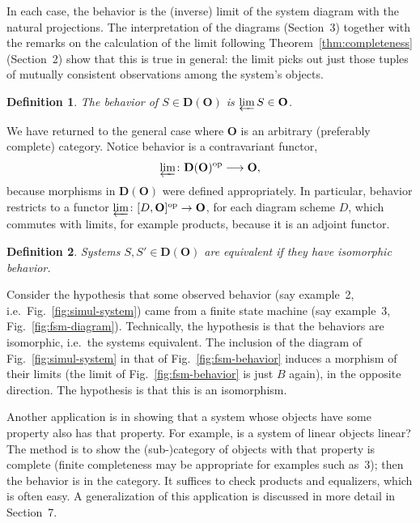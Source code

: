 \documentclass[10pt,a4paper,twocolumn]{article}
\newtheorem*{definition*}{Definition}
\newcommand{\Ocat}{\mathbf{O}}          %
\newcommand{\Dcat}{\mathbf{D}}          %
\begin{document}
In each case, the behavior is the (inverse) limit of the system diagram with the natural projections.
The interpretation of the diagrams (Section~3) together with the remarks on the calculation of the limit following Theorem~\ref{thm:completeness} (Section~2) show that this is true in general: the limit picks out just those tuples of mutually consistent observations among the system's objects.

\begin{definition*}
  The \emph{behavior} of $S\in\Dcat(\Ocat)$ is $\varprojlim S\in\Ocat$.
\end{definition*}

We have returned to the general case where $\Ocat$ is an arbitrary (preferably complete) category.
Notice behavior is a contravariant
functor,
\begin{equation*}
  \varprojlim\colon \Dcat(\Ocat)^{\mathrm{op}}\longrightarrow \Ocat,
\end{equation*}
because morphisms in $\Dcat(\Ocat)$ were defined appropriately.
In particular, behavior restricts to a functor
$\varprojlim\colon [D,\Ocat]^{\mathrm{op}}\to\Ocat$, for each diagram
scheme $D$, which commutes with limits, for example products, because it is an adjoint functor.

\begin{definition*}
  Systems $S,S'\in\Dcat(\Ocat)$ are \emph{equivalent} if they have isomorphic behavior.
\end{definition*}

Consider the hypothesis that some observed behavior (say example~2, i.e.\ Fig.~\ref{fig:simul-system}) came from a finite state machine (say example~3, Fig.~\ref{fig:fsm-diagram}).
Technically, the hypothesis is that the behaviors are isomorphic, i.e.\ the systems equivalent.
The inclusion of the diagram of Fig.~\ref{fig:simul-system} in that of Fig.~\ref{fig:fsm-behavior} induces a morphism of their limits (the limit of Fig.~\ref{fig:fsm-behavior} is just $B$ again), in the opposite direction.
The hypothesis is that this is an isomorphism.

Another application is in showing that a system whose objects have some property also has that property.
For example, is a system of linear objects linear?
The method is to show the (sub-)category of objects with that property is complete (finite completeness may be appropriate for examples such as~3); then the behavior is in the category.
It suffices to check products and equalizers, which is often easy.
A generalization of this application is discussed in more detail in Section~7.
\end{document}

